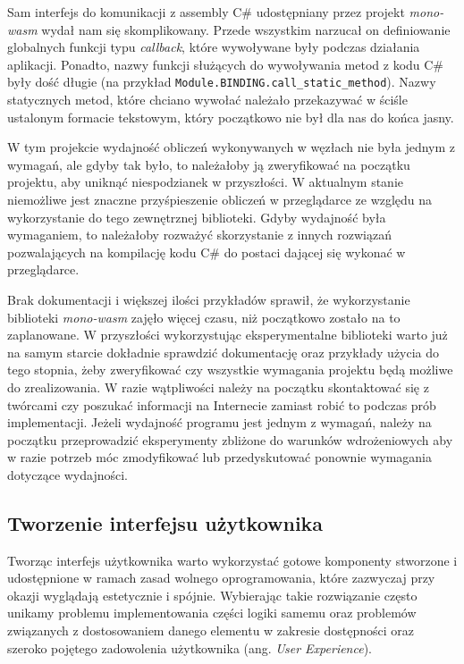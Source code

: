 \documentclass[a4paper,11pt,twoside]{report}
\theoremstyle{definition}
\begin{document}
            Sam interfejs do komunikacji z assembly C\# udostępniany przez projekt \textit{mono-wasm} wydał nam się skomplikowany. Przede wszystkim narzucał on definiowanie globalnych funkcji typu \textit{callback}, które wywoływane były podczas działania aplikacji. Ponadto, nazwy funkcji służących do wywoływania metod z kodu C\# były dość długie (na przykład \texttt{Module.BINDING.call\_static\_method}). Nazwy statycznych metod, które chciano wywołać należało przekazywać w ściśle ustalonym formacie tekstowym, który początkowo nie był dla nas do końca jasny.
            
            W tym projekcie wydajność obliczeń wykonywanych w węzłach nie była jednym z wymagań, ale gdyby tak było, to należałoby ją zweryfikować na początku projektu, aby uniknąć niespodzianek w przyszłości. W aktualnym stanie niemożliwe jest znaczne przyśpieszenie obliczeń w przeglądarce ze względu na wykorzystanie do tego zewnętrznej biblioteki. Gdyby wydajność była wymaganiem, to należałoby rozważyć skorzystanie z innych rozwiązań pozwalających na kompilację kodu C\# do postaci dającej się wykonać w przeglądarce.
            
            Brak dokumentacji i większej ilości przykładów sprawił, że wykorzystanie biblioteki \textit{mono-wasm} zajęło więcej czasu, niż początkowo zostało na to zaplanowane.
            W przyszłości wykorzystując eksperymentalne biblioteki warto już na samym starcie dokładnie sprawdzić dokumentację oraz przykłady użycia do tego stopnia, żeby zweryfikować czy wszystkie wymagania projektu będą możliwe do zrealizowania. W razie wątpliwości należy na początku skontaktować się z twórcami czy poszukać informacji na Internecie zamiast robić to podczas prób implementacji.
            Jeżeli wydajność programu jest jednym z wymagań, należy na początku przeprowadzić eksperymenty zbliżone do warunków wdrożeniowych aby w razie potrzeb móc zmodyfikować lub przedyskutować ponownie wymagania dotyczące wydajności.
        
        \subsection{Tworzenie interfejsu użytkownika}
            Tworząc interfejs użytkownika warto wykorzystać gotowe komponenty stworzone i udostępnione w ramach zasad wolnego oprogramowania, które zazwyczaj przy okazji wyglądają estetycznie i spójnie. Wybierając takie rozwiązanie często unikamy problemu implementowania części logiki samemu oraz problemów związanych z dostosowaniem danego elementu w zakresie dostępności oraz szeroko pojętego zadowolenia użytkownika (ang. {\textit{User Experience})}.
            
\end{document}
